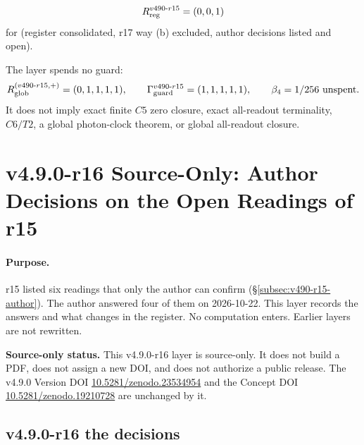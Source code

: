 \[
R_{\rm reg}^{v490\text{-}r15}=(0,0,1)
\]
for (register consolidated, r17 way (b) excluded, author decisions listed and open).

The layer spends no guard:
\[
R_{\rm glob}^{(v490\text{-}r15,+)}=(0,1,1,1,1),
\qquad
\Gamma_{\rm guard}^{v490\text{-}r15}=(1,1,1,1,1),
\qquad
\beta_4=1/256\ \text{unspent}.
\]
It does not imply exact finite \(C5\) zero closure, exact all-readout terminality,
\(C6/T2\), a global photon-clock theorem, or global all-readout closure.

\clearpage
\section*{v4.9.0-r16 Source-Only: Author Decisions on the Open Readings of r15}
\label{sec:v490-r16-author-decisions}

\paragraph{Purpose.}
r15 listed six readings that only the author can confirm (\S\ref{subsec:v490-r15-author}).  The author answered four of them
on 2026-10-22.  This layer records the answers and what changes in the register.  No computation enters.  Earlier layers are
not rewritten.

\noindent\textbf{Source-only status.}
This v4.9.0-r16 layer is source-only.  It does not build a PDF, does not assign a new DOI,
and does not authorize a public release.  The v4.9.0 Version DOI
\href{https://doi.org/10.5281/zenodo.23534954}{10.5281/zenodo.23534954} and the Concept DOI
\href{https://doi.org/10.5281/zenodo.19210728}{10.5281/zenodo.19210728} are unchanged by it.

\subsection*{v4.9.0-r16 the decisions}
\label{subsec:v490-r16-decisions}

